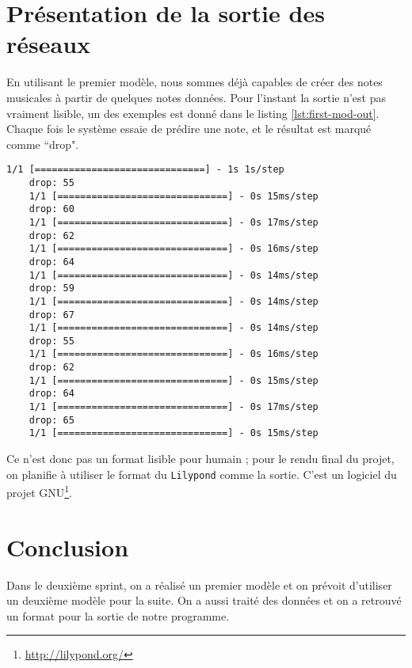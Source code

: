 \documentclass{article}
\begin{document}
\section{Présentation de la sortie des réseaux}

\par En utilisant le premier modèle, nous sommes déjà capables de créer des notes musicales à partir de quelques notes données. Pour l'instant la sortie n'est pas vraiment lisible, un des exemples est donné dans le listing \ref{lst:first-mod-out}. Chaque fois le système essaie de prédire une note, et le résultat est marqué comme ``drop".

\begin{lstlisting}[caption={Une sortie du premier modèle.}, label={lst:first-mod-out}]
    1/1 [==============================] - 1s 1s/step
    drop: 55
    1/1 [==============================] - 0s 15ms/step
    drop: 60
    1/1 [==============================] - 0s 17ms/step
    drop: 62
    1/1 [==============================] - 0s 16ms/step
    drop: 64
    1/1 [==============================] - 0s 14ms/step
    drop: 59
    1/1 [==============================] - 0s 14ms/step
    drop: 67
    1/1 [==============================] - 0s 14ms/step
    drop: 55
    1/1 [==============================] - 0s 16ms/step
    drop: 62
    1/1 [==============================] - 0s 15ms/step
    drop: 64
    1/1 [==============================] - 0s 17ms/step
    drop: 65
    1/1 [==============================] - 0s 15ms/step
\end{lstlisting}

\par Ce n'est donc pas un format lisible pour humain ; pour le rendu final du projet, on planifie à utiliser le format du \texttt{Lilypond} comme la sortie. C'est un logiciel du projet GNU\footnote{\url{http://lilypond.org/}}.

\section{Conclusion}

\par Dans le deuxième sprint, on a réalisé un premier modèle et on prévoit d'utiliser un deuxième modèle pour la suite. On a aussi traité des données et on a retrouvé un format pour la sortie de notre programme. 



\end{document}
